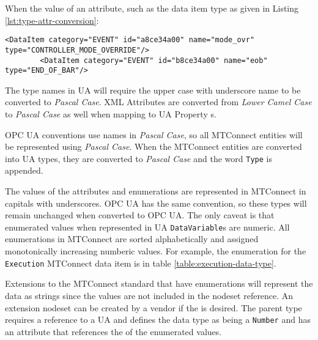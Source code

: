 When the value of an attribute, such as the data item type as given in Listing \ref{lst:type-attr-conversion}:

\begin{lstlisting}[firstnumber=1,%
    caption={\texttt{DataItem} \texttt{type} Attribtue Conversion}, label={lst:type-attr-conversion}]
        <DataItem category="EVENT" id="a8ce34a00" name="mode_ovr" type="CONTROLLER_MODE_OVERRIDE"/>
        <DataItem category="EVENT" id="b8ce34a00" name="eob" type="END_OF_BAR"/>
\end{lstlisting}

The type names in UA will require the upper case with underscore name to be converted to \textit{Pascal Case}. XML Attributes are converted from \textit{Lower Camel Case} to \textit{Pascal Case} as well when mapping to UA Property s.

OPC UA conventions use names in \textit{Pascal Case}, so all MTConnect entities will be represented using \textit{Pascal Case}. When the MTConnect entities are converted into UA types, they are converted to \textit{Pascal Case} and the word \texttt{Type} is appended. 

The values of the attributes and enumerations are represented in MTConnect in capitals with underscores. OPC UA has the same convention, so these types will remain unchanged when converted to OPC UA. The only caveat is that enumerated values when represented in UA \texttt{DataVariable}s are numeric. All enumerations in MTConnect are sorted alphabetically and assigned monotonically increasing numberic values. For example, the enumeration for the \texttt{Execution} MTConnect data item is in table \ref{table:execution-data-type}.

Extensions to the MTConnect standard that have enumerations will represent the data as strings since the values are not included in the nodeset reference. An extension nodeset can be created by a vendor if the  is desired. The parent type requires a reference to a UA  and defines the data type as being a \texttt{Number} and has an attribute that references the  of the enumerated values.

